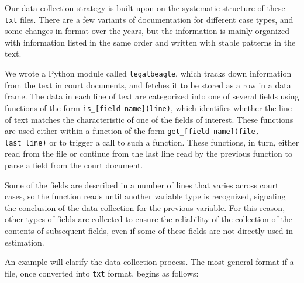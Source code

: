 \documentclass[11pt]{paper}
\begin{document}
Our data-collection strategy is built upon on the systematic structure of these \texttt{txt} files. 
There are a few variants of documentation for different case types, and some changes in format over the years, 
but the information is mainly organized with information listed in the same order and written with stable patterns in the text. 

We wrote a Python module called \texttt{legalbeagle}, 
which tracks down information from the text in court documents, 
and fetches it to be stored as a row in a data frame. 
The data in each line of text are categorized into one of several fields using functions of the form \texttt{is\_[field name](line)}, 
which identifies whether the line of text matches the characteristic of one of the fields of interest. 
These functions are used either within a function of the form \texttt{get\_[field name](file, last\_line)} 
or to trigger a call to such a function. 
These functions, in turn, either read from the file or continue from the last line read by the previous function
to parse a field from the court document. 

Some of the fields are described in a number of lines that varies across court cases, 
so the function reads until another variable type is recognized, 
signaling the conclusion of the data collection for the previous variable. 
For this reason, other types of fields are collected to ensure the reliability of the collection of the 
contents of subsequent fields, even if some of these fields are not directly used in estimation. 

An example will clarify the data collection process. 
The most general format if a file, once converted into \texttt{txt} format, begins as follows:
\end{document}
